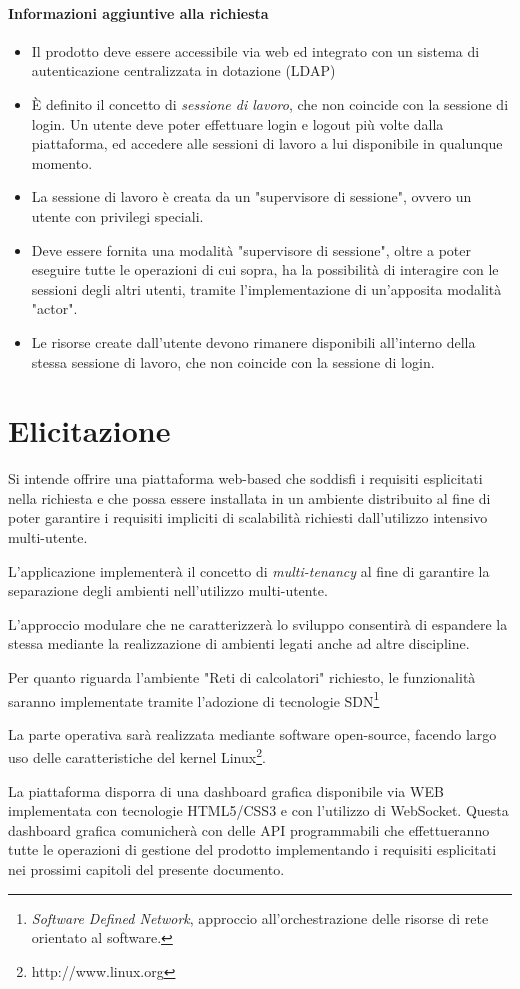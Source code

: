 \documentclass[../main.tex]{subfiles}
\begin{document}
\paragraph{Informazioni aggiuntive alla richiesta}
\begin{itemize}
    \item Il prodotto deve essere accessibile via web ed integrato con un sistema di autenticazione centralizzata in dotazione (LDAP)
    \item È definito il concetto di \textit{sessione di lavoro}, che non coincide con la sessione di login. Un utente deve poter effettuare login e logout più volte dalla piattaforma, ed accedere alle sessioni di lavoro a lui disponibile in qualunque momento.
    \item La sessione di lavoro è creata da un "supervisore di sessione", ovvero un utente con privilegi speciali.
    \item Deve essere fornita una modalità "supervisore di sessione", oltre a poter eseguire tutte le operazioni di cui sopra, ha la possibilità di interagire con le sessioni degli altri utenti, tramite l'implementazione di un'apposita modalità "actor".
    \item Le risorse create dall'utente devono rimanere disponibili all'interno della stessa sessione di lavoro, che non coincide con la sessione di login.
\end{itemize}

\section{Elicitazione}
Si intende offrire una piattaforma web-based che soddisfi i requisiti esplicitati nella richiesta e che possa essere installata in un ambiente distribuito al fine di poter garantire i requisiti impliciti di scalabilità richiesti dall'utilizzo intensivo multi-utente.

L'applicazione implementerà il concetto di \textit{multi-tenancy} al fine di garantire la separazione degli ambienti nell'utilizzo multi-utente.

L'approccio modulare che ne caratterizzerà lo sviluppo consentirà di espandere la stessa mediante la realizzazione di ambienti legati anche ad altre discipline.

Per quanto riguarda l'ambiente "Reti di calcolatori" richiesto, le funzionalità saranno implementate tramite l'adozione di tecnologie SDN\footnote{\textit {Software Defined Network}, approccio all'orchestrazione delle risorse di rete orientato al software.}

La parte operativa sarà realizzata mediante software open-source, facendo largo uso delle caratteristiche del kernel Linux\footnote{http://www.linux.org}.

La piattaforma disporra di una dashboard grafica disponibile via WEB implementata con tecnologie HTML5/CSS3 e con l'utilizzo di WebSocket.
Questa dashboard grafica comunicherà con delle API programmabili che effettueranno tutte le operazioni di gestione del prodotto implementando i requisiti esplicitati nei prossimi capitoli del presente documento.
\end{document}
